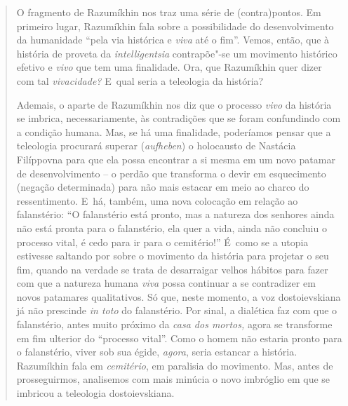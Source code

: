 {\begin{quote}
O fragmento de Razumíkhin nos traz uma série de (contra)pontos. Em
primeiro lugar, Razumíkhin fala sobre a possibilidade do desenvolvimento
da humanidade ``pela via histórica e \emph{viva} até o fim''. Vemos,
então, que à história de proveta da \emph{intelligentsia} contrapõe"-se
um movimento histórico efetivo e \emph{vivo} que tem uma finalidade.
Ora, que Razumíkhin quer dizer com tal \emph{vivacidade?} E~qual seria a
teleologia da história?

Ademais, o aparte de Razumíkhin nos diz que o processo \emph{vivo} da
história se imbrica, necessariamente, às contradições que se foram
confundindo com a condição humana. Mas, se há uma finalidade, poderíamos
pensar que a teleologia procurará superar (\emph{aufheben}) o holocausto
de Nastácia Filíppovna para que ela possa encontrar a si mesma em um
novo patamar de desenvolvimento -- o perdão que transforma o devir em
esquecimento (negação determinada) para não mais estacar em meio ao
charco do ressentimento. E~há, também, uma nova colocação em relação ao
falanstério: ``O falanstério está pronto, mas a natureza dos senhores
ainda não está pronta para o falanstério, ela quer a vida, ainda não
concluiu o processo vital, é cedo para ir para o cemitério!'' É~como se
a utopia estivesse saltando por sobre o movimento da história para
projetar o seu fim, quando na verdade se trata de desarraigar velhos
hábitos para fazer com que a natureza humana \emph{viva} possa continuar
a se contradizer em novos patamares qualitativos. Só que, neste momento,
a voz dostoievskiana já não prescinde \emph{in toto} do falanstério. Por
sinal, a dialética faz com que o falanstério, antes muito próximo da
\emph{casa dos mortos,} agora se transforme em fim ulterior do
``processo vital''. Como o homem não estaria pronto para o falanstério,
viver sob sua égide, \emph{agora}, seria estancar a história. Razumíkhin
fala em \emph{cemitério}, em paralisia do movimento. Mas, antes de
prosseguirmos, analisemos com mais minúcia o novo imbróglio em que se
imbricou a teleologia dostoievskiana.


\end{quote}}
